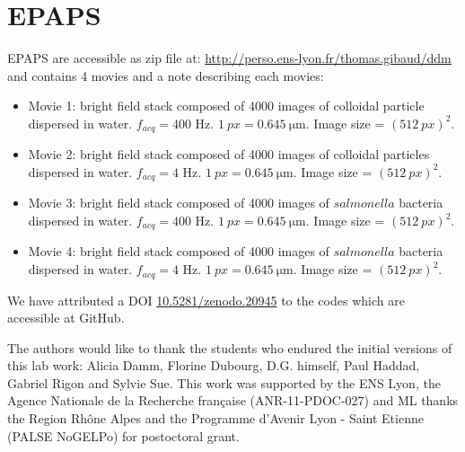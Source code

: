 \documentclass[prb,reprint,amsmath,amssymb]{revtex4-1}
\begin{document}
\section*{EPAPS}
\label{sec:epaps}
EPAPS are accessible as zip file at: \url{http://perso.ens-lyon.fr/thomas.gibaud/ddm} and  contains 4 movies and a note describing each movies:
\begin{itemize}
 \item Movie 1: bright field stack composed of 4000 images of colloidal particle dispersed in water. $f_{acq}=400$ Hz. $\SI{1}{px} = \SI{0.645}{\micro\meter}$. Image size = $(\SI{512}{px})^2$.
 \item Movie 2: bright field stack composed of 4000 images of colloidal particles dispersed in water. $f_{acq}=4$ Hz. $\SI{1}{px} = \SI{0.645}{\micro\meter}$. Image size = $(\SI{512}{px})^2$.
 \item Movie 3: bright field stack composed of 4000 images of $salmonella$ bacteria dispersed in water. $f_{acq}=400$ Hz. $\SI{1}{px} = \SI{0.645}{\micro\meter}$. Image size = $(\SI{512}{px})^2$.
 \item Movie 4: bright field stack composed of 4000 images of $salmonella$ bacteria dispersed in water. $f_{acq}=4$ Hz. $\SI{1}{px} = \SI{0.645}{\micro\meter}$. Image size = $(\SI{512}{px})^2$.
\end{itemize}

We have attributed a DOI \href{http://dx.doi.org/10.5281/zenodo.20945}{10.5281/zenodo.20945}\cite{code_github} to the codes which are accessible at GitHub.


\begin{acknowledgments}
The authors would like to thank the students who endured the initial versions of this lab work: Alicia Damm, Florine Dubourg, D.G. himself, Paul Haddad, Gabriel Rigon and Sylvie Sue. 
This work was supported by the ENS Lyon, the Agence Nationale de la Recherche fran\c{c}aise (ANR-11-PDOC-027) and ML thanks the Region Rh\^one Alpes and
the Programme d'Avenir Lyon - Saint Etienne (PALSE NoGELPo) for postoctoral grant.
\end{acknowledgments}



\end{document}
